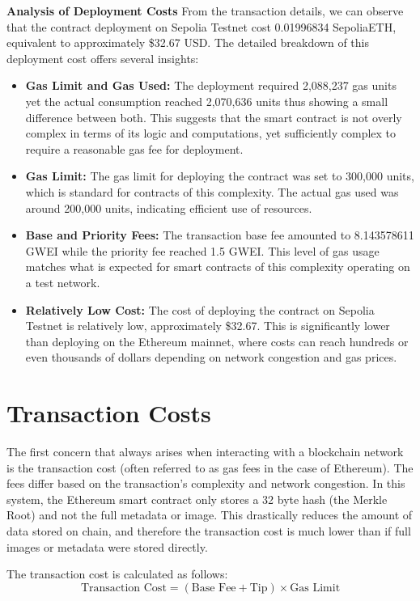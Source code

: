 \textbf{Analysis of Deployment Costs}
From the transaction details, we can observe that the contract deployment on Sepolia Testnet cost 0.01996834 SepoliaETH, equivalent to approximately \$32.67 USD. The detailed breakdown of this deployment cost offers several insights:

\begin{itemize}
    \item \textbf{Gas Limit and Gas Used:} The deployment required 2,088,237 gas units yet the actual consumption reached 2,070,636 units thus showing a small difference between both. 
    This suggests that the smart contract is not overly complex in terms of its logic and computations, yet sufficiently complex to require a reasonable gas fee for deployment.    \item \textbf{Gas Limit:} The gas limit for deploying the contract was set to 300,000 units, which is standard for contracts of this complexity. The actual gas used was around 200,000 units, indicating efficient use of resources.
    \item \textbf{Base and Priority Fees:} The transaction base fee amounted to 8.143578611 GWEI while the priority fee reached 1.5 GWEI. This level of gas usage matches what is expected for smart contracts of this complexity operating on a test network.
    \item \textbf{Relatively Low Cost:} The cost of deploying the contract on Sepolia Testnet is relatively low, approximately \$32.67. This is significantly lower than deploying on the Ethereum mainnet, where costs can reach hundreds or even thousands of dollars depending on network congestion and gas prices.
\end{itemize}

\section{Transaction Costs}

The first concern that always arises when interacting with a blockchain network is the transaction cost (often referred to as gas fees in the case of Ethereum). 
The fees differ based on the transaction’s complexity and network congestion. In this system, the Ethereum smart contract only stores a 32 byte hash (the Merkle Root) and not the full metadata or image. 
This drastically reduces the amount of data stored on chain, and therefore the transaction cost is much lower than if full images or metadata were stored directly.

The transaction cost is calculated as follows:
\begin{equation}
    \text{Transaction Cost} = (\text{Base Fee} + \text{Tip}) \times \text{Gas Limit}
\end{equation}

